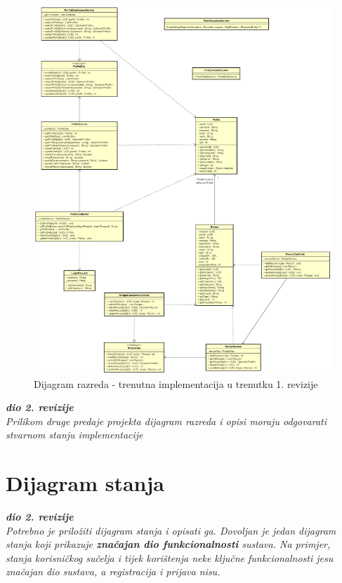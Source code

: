  \begin{figure}[H]
			    \centering
			    \includegraphics[width=1\linewidth]{slike//dijagrami/Dijagram razreda.png}
			    \caption{Dijagram razreda - trenutna implementacija u trenutku 1. revizije}
			    \label{fig:enter-label}
			\end{figure}
   \eject
   \textbf{\textit{dio 2. revizije}}\\			
			
			\textit{Prilikom druge predaje projekta dijagram razreda i opisi moraju odgovarati stvarnom stanju implementacije}
			
			
			
			\eject
		
		\section{Dijagram stanja}
			
			
			\textbf{\textit{dio 2. revizije}}\\
			
			\textit{Potrebno je priložiti dijagram stanja i opisati ga. Dovoljan je jedan dijagram stanja koji prikazuje \textbf{značajan dio funkcionalnosti} sustava. Na primjer, stanja korisničkog sučelja i tijek korištenja neke ključne funkcionalnosti jesu značajan dio sustava, a registracija i prijava nisu. }
			
